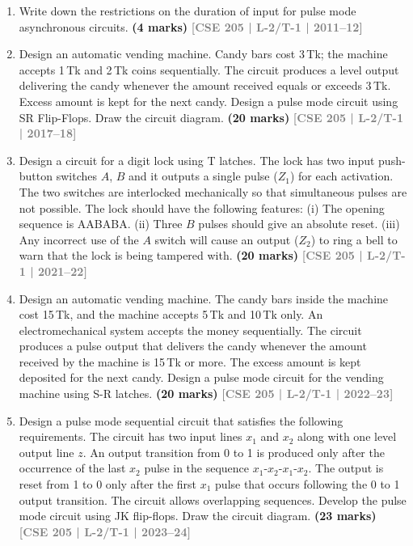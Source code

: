 \documentclass[12pt,a4paper]{article}
\newcommand{\yr}[1]{\hfill\textcolor{gray}{\small\textbf{[#1]}}}
\newcommand{\mk}[1]{\textcolor{orange!70!black}{\small\textbf{(#1 marks)}}}
\begin{document}
\begin{enumerate}

\item Write down the restrictions on the duration of input for pulse mode asynchronous circuits.
\mk{4} \yr{CSE 205 | L-2/T-1 | 2011--12}


\item Design an automatic vending machine. Candy bars cost 3\,Tk; the machine accepts 1\,Tk and 2\,Tk coins sequentially. The circuit produces a level output delivering the candy whenever the amount received equals or exceeds 3\,Tk. Excess amount is kept for the next candy. Design a pulse mode circuit using SR Flip-Flops. Draw the circuit diagram.
\mk{20} \yr{CSE 205 | L-2/T-1 | 2017--18}

\item Design a circuit for a digit lock using T latches. The lock has two input push-button switches $A$, $B$ and it outputs a single pulse ($Z_1$) for each activation. The two switches are interlocked mechanically so that simultaneous pulses are not possible. The lock should have the following features: (i) The opening sequence is AABABA. (ii) Three $B$ pulses should give an absolute reset. (iii) Any incorrect use of the $A$ switch will cause an output ($Z_2$) to ring a bell to warn that the lock is being tampered with.
\mk{20} \yr{CSE 205 | L-2/T-1 | 2021--22}

\item Design an automatic vending machine. The candy bars inside the machine cost 15\,Tk, and the machine accepts 5\,Tk and 10\,Tk only. An electromechanical system accepts the money sequentially. The circuit produces a pulse output that delivers the candy whenever the amount received by the machine is 15\,Tk or more. The excess amount is kept deposited for the next candy. Design a pulse mode circuit for the vending machine using S-R latches.
\mk{20} \yr{CSE 205 | L-2/T-1 | 2022--23}

\item Design a pulse mode sequential circuit that satisfies the following requirements. The circuit has two input lines $x_1$ and $x_2$ along with one level output line $z$. An output transition from 0 to 1 is produced only after the occurrence of the last $x_2$ pulse in the sequence $x_1\text{-}x_2\text{-}x_1\text{-}x_2$. The output is reset from 1 to 0 only after the first $x_1$ pulse that occurs following the 0 to 1 output transition. The circuit allows overlapping sequences. Develop the pulse mode circuit using JK flip-flops. Draw the circuit diagram.
\mk{23} \yr{CSE 205 | L-2/T-1 | 2023--24}


\end{enumerate}
\end{document}

